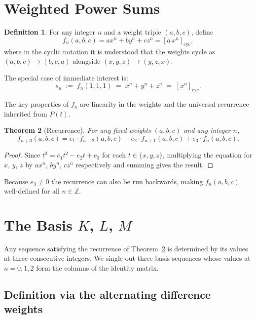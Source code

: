 \documentclass[12pt]{article}
\newtheorem{theorem}{Theorem}[section]
\theoremstyle{definition}
\newtheorem{definition}[theorem]{Definition}
\newcommand{\cyc}[1]{\left[#1\right]_{\!\mathrm{cyc}}}
\begin{document}
	\section{Weighted Power Sums}
	
	\begin{definition}
		For any integer $n$ and a weight triple $(a, b, c)$, define
		\[
		f_n(a,b,c) = a x^n + b y^n + c z^n = \cyc{a\, x^n},
		\]
		where in the cyclic notation it is understood that the weights cycle
		as $(a,b,c) \to (b,c,a)$ alongside $(x,y,z) \to (y,z,x)$.
	\end{definition}
	
	The special case of immediate interest is:
	\[
	s_n \;:=\; f_n(1,1,1) \;=\; x^n + y^n + z^n \;=\; \cyc{x^n}.
	\]
	
	The key properties of $f_n$ are linearity in the weights and the universal
	recurrence inherited from $P(t)$.
	
	\begin{theorem}[Recurrence]
		\label{thm:recurrence}
		For any fixed weights $(a,b,c)$ and any integer $n$,
		\[
		f_{n+3}(a,b,c) = e_1 \cdot f_{n+2}(a,b,c) - e_2 \cdot f_{n+1}(a,b,c) + e_3 \cdot f_n(a,b,c).
		\]
	\end{theorem}
	\begin{proof}
		Since $t^3 = e_1 t^2 - e_2 t + e_3$ for each $t \in \{x,y,z\}$, multiplying the equation for $x$, $y$, $z$ by $a x^n$, $b y^n$, $c z^n$ respectively and summing gives the result.
	\end{proof}
	
	Because $e_3 \neq 0$ the recurrence can also be run backwards, making
	$f_n(a,b,c)$ well-defined for all $n \in \mathbb{Z}$.
	
	\section{The Basis $K$, $L$, $M$}
	
	Any sequence satisfying the recurrence of Theorem~\ref{thm:recurrence}
	is determined by its values at three consecutive integers.  We single
	out three basis sequences whose values at $n = 0, 1, 2$ form the columns of the identity matrix.
	
	\subsection{Definition via the alternating difference weights}
	
\end{document}

